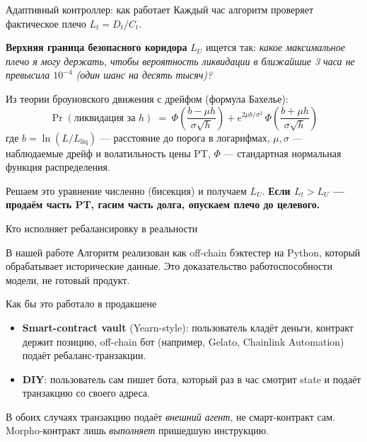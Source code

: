 \documentclass[11pt,aspectratio=169]{beamer}
\begin{document}
\begin{frame}{Адаптивный контроллер: как работает}
  \footnotesize
  Каждый час алгоритм проверяет фактическое плечо $L_t = D_t/C_t$.

  \vspace{0.4em}
  \normalsize
  \textbf{Верхняя граница безопасного коридора} $L_U$ ищется так:
  \emph{какое максимальное плечо я могу держать, чтобы вероятность
  ликвидации в ближайшие 3 часа не превысила $10^{-4}$ (один шанс
  на десять тысяч)?}

  \vspace{0.4em}
  Из теории броуновского движения с дрейфом (формула Бахелье):
  \[
    \Pr(\text{ликвидация за } h) \;=\;
    \Phi\!\left(\frac{b - \mu h}{\sigma \sqrt{h}}\right)
    + e^{2\mu b / \sigma^2}\,
      \Phi\!\left(\frac{b + \mu h}{\sigma \sqrt{h}}\right)
  \]
  где $b = \ln(L/L_{\text{liq}})$ --- расстояние до порога в логарифмах,
  $\mu, \sigma$ --- наблюдаемые дрейф и волатильность цены PT,
  $\Phi$ --- стандартная нормальная функция распределения.

  \vspace{0.4em}
  Решаем это уравнение численно (бисекция) и получаем $L_U$.
  \textbf{Если $L_t > L_U$ --- продаём часть PT, гасим часть долга, опускаем плечо до целевого.}
\end{frame}

\begin{frame}{Кто исполняет ребалансировку в реальности}
  \footnotesize
  \vspace{0.3em}
  \begin{block}{В нашей работе}
    Алгоритм реализован как off-chain бэктестер на Python, который
    обрабатывает исторические данные. Это доказательство
    работоспособности модели, не готовый продукт.
  \end{block}

  \vspace{0.3em}
  \begin{block}{Как бы это работало в продакшене}
    \begin{itemize}\itemsep0.15em
      \item \textbf{Smart-contract vault} (Yearn-style): пользователь
            кладёт деньги, контракт держит позицию, off-chain бот
            (например, Gelato, Chainlink Automation) подаёт
            ребаланс-транзакции.
      \item \textbf{DIY}: пользователь сам пишет бота, который раз в
            час смотрит state и подаёт транзакцию со своего адреса.
    \end{itemize}
  \end{block}

  \vspace{0.3em}
  \normalsize
  В обоих случаях транзакцию подаёт \emph{внешний агент}, не
  смарт-контракт сам. Morpho-контракт лишь \emph{выполняет}
  пришедшую инструкцию.
\end{frame}
\end{document}
